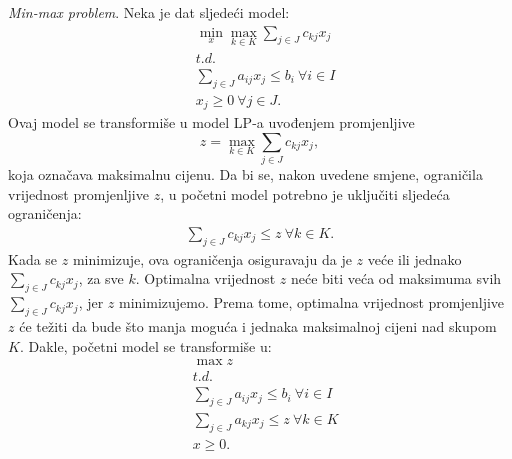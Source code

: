 \documentclass[a4paper, utf8, 11pt, colorlinks]{book}
\theoremstyle{definition}
\begin{document}
\emph{Min-max problem}. Neka je dat sljedeći model: 
\begin{align*}
	&\min_{x} \max_{k \in K} \sum_{j \in J} c_{kj} x_j \\
	&{t.d.} \nonumber \\
	& \sum_{j \in J} a_{ij} x_j \leq b_i\  \forall i \in I \\
	& x_j \geq 0\ \forall j \in J.
\end{align*}
Ovaj  model se transformiše u model LP-a uvođenjem promjenljive 
 $$z=\max_{k \in K} \sum_{j \in J} c_{kj}x_j,$$
  koja označava maksimalnu cijenu. Da bi se, nakon uvedene smjene, ograničila vrijednost promjenljive $z$, u početni model potrebno je uključiti sljedeća ograničenja: 
\begin{eqnarray}
	\sum_{j \in J} c_{kj} x_j \leq z\ \forall k \in K.
\end{eqnarray}
Kada se $z$ minimizuje, ova ograničenja osiguravaju da je $z$ veće ili jednako  $\sum_{j \in J} c_{kj}x_j$, za sve $k$. Optimalna vrijednost $z$ neće biti veća od maksimuma svih $\sum_{j \in J} c_{kj}x_j$, jer  $z$ minimizujemo. Prema tome, optimalna vrijednost promjenljive $z$ će težiti da bude što manja moguća i jednaka maksimalnoj cijeni nad skupom $K$. Dakle, početni model se transformiše u:
\begin{align*}
	&\max z \\
    &{t.d.} \nonumber \\
	&\sum_{j \in J} a_{ij} x_j \leq b_i\  \forall i \in I \\ 
	& 	 \sum_{j \in J} a_{kj} x_j \leq z\ \forall k \in K \\
	& x \geq 0.
\end{align*}
\end{document}
